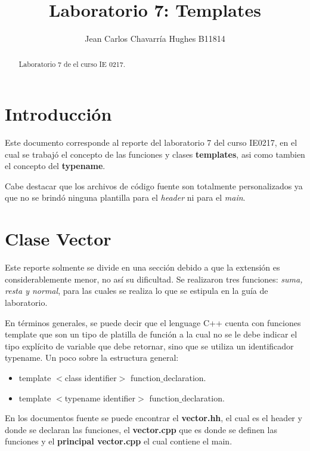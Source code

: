 \documentclass{article}
\begin{document}
\title{Laboratorio 7: Templates}
\author{Jean Carlos Chavarr\' ia Hughes B11814}
\maketitle
\begin{abstract}
Laboratorio 7 de el curso IE 0217.
\end{abstract}
\section{Introducci\' on}
Este documento corresponde al reporte del laboratorio 7 del curso IE0217, en el cual se trabaj\' o el concepto de las funciones y clases \textbf{templates}, asi como tambien el concepto del \textbf{typename}.

Cabe destacar que los archivos de c\' odigo fuente son totalmente personalizados ya que no se brind\' o ninguna plantilla para el \textit{header} ni para el \textit{main}.

\section{Clase Vector}
Este reporte solmente se divide en una secci\' on debido a que la extensi\' on es considerablemente menor, no as\' i su dificultad.
Se realizaron tres funciones: \textit{suma, resta y normal}, para las cuales se realiza lo que se estipula en la gu\' ia de laboratorio.

En t\' erminos generales, se puede decir que el lenguage C++ cuenta con funciones template que son un tipo de platilla de funci\' on a la cual no se le debe indicar el tipo expl\' icito de variable que debe retornar, sino que se utiliza un identificador typename.
Un poco sobre la estructura general:

\begin{itemize}
\item template $<$class identifier$>$ function$\_$declaration.
\item template $<$typename identifier$>$ function$\_$declaration.
\end{itemize}

En los documentos fuente se puede encontrar el \textbf{vector.hh}, el cual es el header y donde se declaran las funciones, el \textbf{vector.cpp} que es donde se definen las funciones y el \textbf{principal vector.cpp} el cual contiene el main.
\end{document}
